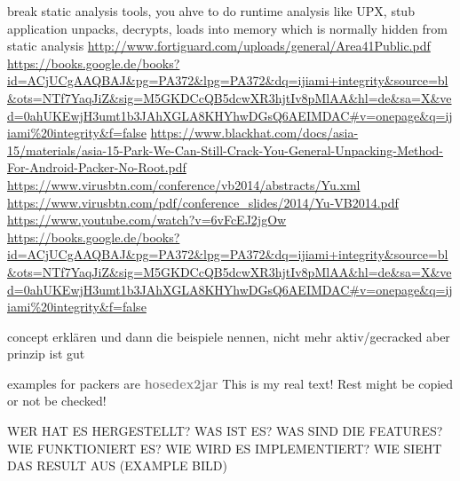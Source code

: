break static analysis tools, you ahve to do runtime analysis\newline
like UPX, stub application unpacks, decrypts, loads into memory which is normally hidden from static analysis\newline
\url{http://www.fortiguard.com/uploads/general/Area41Public.pdf}\newline
\url{https://books.google.de/books?id=ACjUCgAAQBAJ\&pg=PA372\&lpg=PA372\&dq=ijiami+integrity\&source=bl\&ots=NTf7YaqJiZ\&sig=M5GKDCcQB5dcwXR3hjtIv8pMlAA\&hl=de\&sa=X\&ved=0ahUKEwjH3umt1b3JAhXGLA8KHYhwDGsQ6AEIMDAC\#v=onepage\&q=ijiami%20integrity\&f=false}\newline
\url{https://www.blackhat.com/docs/asia-15/materials/asia-15-Park-We-Can-Still-Crack-You-General-Unpacking-Method-For-Android-Packer-No-Root.pdf}\newline
\url{https://www.virusbtn.com/conference/vb2014/abstracts/Yu.xml}\newline
\url{https://www.virusbtn.com/pdf/conference_slides/2014/Yu-VB2014.pdf}\newline
\url{https://www.youtube.com/watch?v=6vFcEJ2jgOw}\newline
\url{https://books.google.de/books?id=ACjUCgAAQBAJ&pg=PA372&lpg=PA372&dq=ijiami+integrity&source=bl&ots=NTf7YaqJiZ&sig=M5GKDCcQB5dcwXR3hjtIv8pMlAA&hl=de&sa=X&ved=0ahUKEwjH3umt1b3JAhXGLA8KHYhwDGsQ6AEIMDAC#v=onepage&q=ijiami%20integrity&f=false}\newline

concept erklären und dann die beispiele nennen, nicht mehr aktiv/gecracked aber prinzip ist gut\newline

examples for packers are
\newline\newline\textbf{\textcolor{gray}{hosedex2jar}}\newline
This is my real text! Rest might be copied or not be checked!



WER HAT ES HERGESTELLT? WAS IST ES? WAS SIND DIE FEATURES? WIE FUNKTIONIERT ES? WIE WIRD ES IMPLEMENTIERT? WIE SIEHT DAS RESULT AUS (EXAMPLE BILD)\newline

